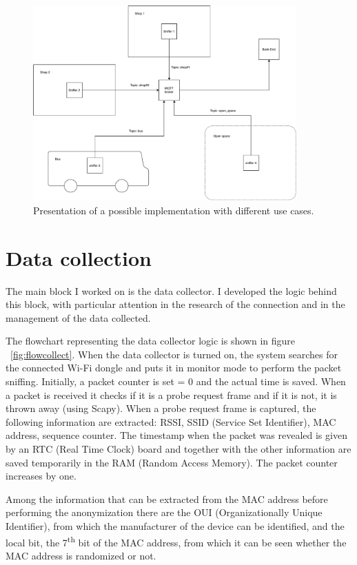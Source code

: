 \begin{figure}[h]
\centering 
\includegraphics[width=0.9\textwidth]{images/excases} 
\caption{Presentation of a possible implementation with different use cases.}
\label{fig:excases}
\end{figure}


\section{Data collection}
\label{sec:collection}
\vspace{0.2 cm} 

The main block I worked on is the data collector. I developed the logic behind this block, with particular attention in the research of the connection and in the management of the data collected.

The flowchart representing the data collector logic is shown in figure ~\ref{fig:flowcollect}. When the data collector is turned on, the system searches for the connected Wi-Fi dongle and puts it in monitor mode to perform the packet sniffing. Initially, a packet counter is set = 0 and the actual time is saved. When a packet is received it checks if it is a probe request frame and if it is not, it is thrown away (using Scapy).
When a probe request frame is captured, the following information are extracted: RSSI, SSID (Service Set Identifier), MAC address, sequence counter. The timestamp when the packet was revealed is given by an RTC (Real Time Clock) board and together with the other information are saved temporarily in the RAM (Random Access Memory). The packet counter increases by one.

Among the information that can be extracted from the MAC address before performing the anonymization there are the OUI (Organizationally Unique Identifier), from which the manufacturer of the device can be identified, and the local bit, the 7\textsuperscript{th} bit of the MAC address, from which it can be seen whether the MAC address is randomized or not.

